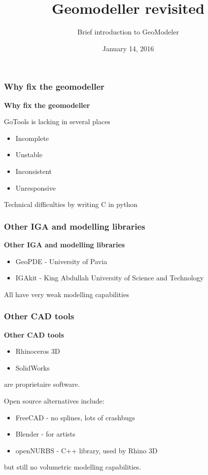 \documentclass{beamer}
\title{Geomodeller revisited}
\author{Brief introduction to GeoModeler}
\institute{Kjetil A. Johannessen}
\date{January 14, 2016}
\theoremstyle{plain}
\theoremstyle{definition}
\begin{document}
\begin{frame}
\titlepage
\end{frame}
\begin{frame}
\frametitle{Why fix the geomodeller}
\textbf{Why fix the geomodeller}

GoTools is lacking in several places
\begin{itemize}
    \item Incomplete
    \item Unstable
    \item Inconsistent
    \item Unresponsive
\end{itemize}
Technical difficulties by writing C in python
\end{frame}


\begin{frame}
\frametitle{Other IGA and modelling libraries}
\textbf{Other IGA and modelling libraries}

\begin{itemize}
    \item GeoPDE - University of Pavia
    \item IGAkit - King Abdullah University of Science and Technology
\end{itemize}
All have very weak modelling capabilities
\end{frame}


\begin{frame}
\frametitle{Other CAD tools}
\textbf{Other CAD tools}

\begin{itemize}
    \item Rhinoceros 3D
    \item SolidWorks 
\end{itemize}
are proprietaire software.

\pause
\vspace{1cm}
Open source alternatives include:
\begin{itemize}
    \item FreeCAD   - no splines, lots of crashbugs
    \item Blender   - for artists
    \item openNURBS - C++ library, used by Rhino 3D
\end{itemize}
\pause
but still no volumetric modelling capabilities.
\end{frame}
\end{document}
